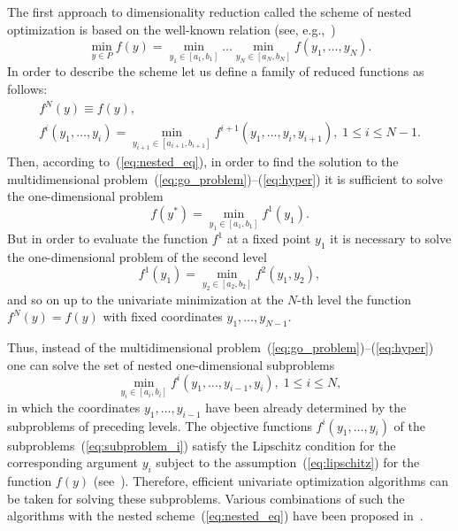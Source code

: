 \documentclass[preprint]{elsarticle}
\begin{document}
The first approach to dimensionality reduction called the scheme of nested optimization is based on the well-known relation (see, e.g.,~\cite{bib5,bib26,bib31})
\begin{equation}
  \label{eq:nested_eq}
  \min_{y \in P} f(y) = \min_{y_1 \in [a_1, b_1]} \dots \min_{y_N \in [a_N, b_N]} f(y_1, \dots, y_N).
\end{equation}
%
In order to describe the scheme let us define a family of reduced functions as follows:
\begin{gather}
  f^N(y) \equiv f(y), \\
  f^i(y_1, \dots, y_i) = \min_{y_{i + 1} \in [a_{i + 1}, b_{i + 1}]} f^{i + 1} (y_1, \dots, y_i, y_{i + 1}), \; 1 \leq i \leq N - 1.
\end{gather}
%
Then, according to~(\ref{eq:nested_eq}), in order to find the solution to the multidimensional problem~(\ref{eq:go_problem})--(\ref{eq:hyper}) it is sufficient to solve the one-dimensional problem
\begin{equation}
  \label{eq:subproblem_0}
  f(y^*) = \min_{y_1 \in [a_1, b_1]} f^1(y_1).
\end{equation}
%
But in order to evaluate the function $f^1$ at a fixed point $y_1$ it is necessary to solve the one-dimensional problem of the second level
\begin{equation}
  f^1(y_1) = \min_{y_2 \in [a_2, b_2]} f^2(y_1, y_2),
\end{equation}
%
and so on up to the univariate minimization at the $N$-th level the function $f^N(y) = f(y)$ with fixed coordinates $y_1, \dots, y_{N - 1}$.

Thus, instead of the multidimensional problem~(\ref{eq:go_problem})--(\ref{eq:hyper}) one can solve the set of nested one-dimensional subproblems
\begin{equation}
  \label{eq:subproblem_i}
  \min_{y_i \in [a_i, b_i]} f^i(y_1, \dots, y_{i - 1}, y_i), \; 1 \leq i \leq N,
\end{equation}
%
in which the coordinates $y_1, \dots, y_{i - 1}$ have been already determined by the subproblems of preceding levels. The objective functions $f^i(y_1, \dots, y_i)$ of the subproblems~(\ref{eq:subproblem_i}) satisfy the Lipschitz condition for the corresponding argument $y_i$ subject to the assumption~(\ref{eq:lipschitz}) for the function $f(y)$ (see~\cite{bib51}). Therefore, efficient univariate optimization algorithms can be taken for solving these subproblems. Various combinations of such the algorithms with the nested scheme~(\ref{eq:nested_eq}) have been proposed in~\cite{bib5,bib9,bib26,bib33,bib34,bib35}.
\end{document}
